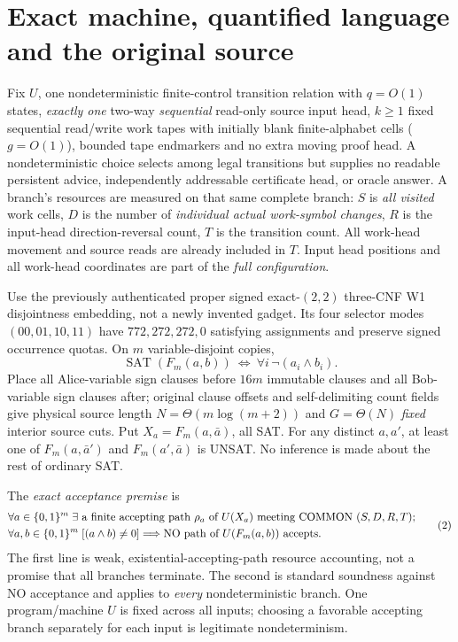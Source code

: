 \documentclass[11pt]{article}
\begin{document}
\section{Exact machine, quantified language and the original source}
Fix $U$, one nondeterministic finite-control transition relation with $q=O(1)$ states, \emph{exactly one} two-way \emph{sequential} read-only source input head, $k\ge1$ fixed sequential read/write work tapes with initially blank finite-alphabet cells ($g=O(1)$), bounded tape endmarkers and no extra moving proof head. A nondeterministic choice selects among legal transitions but supplies no readable persistent advice, independently addressable certificate head, or oracle answer. A branch's resources are measured on that same complete branch: $S$ is \emph{all visited} work cells, $D$ is the number of \emph{individual actual work-symbol changes}, $R$ is the input-head direction-reversal count, $T$ is the transition count. All work-head movement and source reads are already included in $T$. Input head positions and all work-head coordinates are part of the \emph{full configuration}.

Use the previously authenticated proper signed exact-$(2,2)$ three-CNF W1 disjointness embedding, not a newly invented gadget. Its four selector modes $(00,01,10,11)$ have $772,272,272,0$ satisfying assignments and preserve signed occurrence quotas. On $m$ variable-disjoint copies,
\[
\operatorname{SAT}(F_m(a,b))\ \Longleftrightarrow\ 
\forall i\,\neg(a_i\wedge b_i).
\tag{1}
\]
Place all Alice-variable sign clauses before $16m$ immutable clauses and all Bob-variable sign clauses after; original clause offsets and self-delimiting count fields give physical source length $N=\Theta(m\log(m+2))$ and $G=\Theta(N)$ \emph{fixed} interior source cuts. Put $X_a=F_m(a,\bar a)$, all SAT. For any distinct $a,a'$, at least one of $F_m(a,\bar a')$ and $F_m(a',\bar a)$ is UNSAT. No inference is made about the rest of ordinary SAT.

The \emph{exact acceptance premise} is
\[
\begin{split}
&\forall a\in\{0,1\}^{m}\;\exists\hbox{ a finite accepting path }
\rho_a\text{ of }U(X_a)\text{ meeting COMMON }(S,D,R,T);\\
&\forall a,b\in\{0,1\}^{m}\;[(a\wedge b)\ne0]\Longrightarrow
  \text{NO path of }U(F_m(a,b))\text{ accepts}.
\end{split}\tag{2}
\]
The first line is weak, existential-accepting-path resource accounting, not a promise that all branches terminate. The second is standard soundness against NO acceptance and applies to \emph{every} nondeterministic branch. One program/machine $U$ is fixed across all inputs; choosing a favorable accepting branch separately for each input is legitimate nondeterminism.
\end{document}
